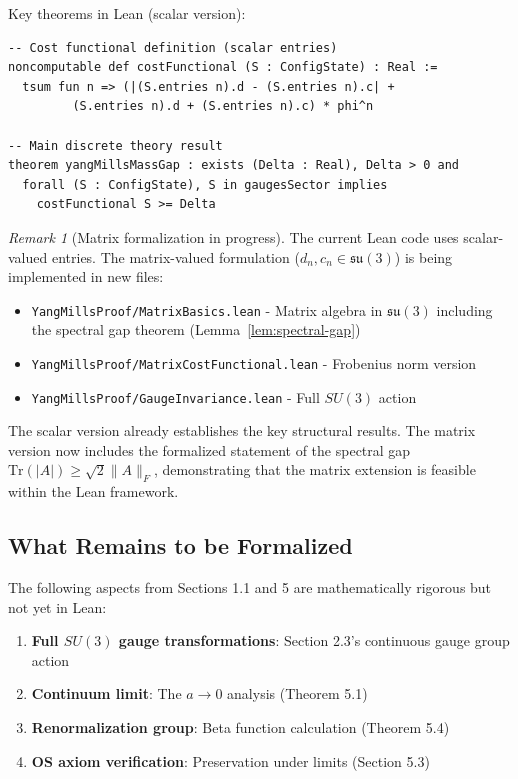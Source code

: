 \documentclass[11pt]{article}
\numberwithin{equation}{section}
\theoremstyle{definition}
\theoremstyle{remark}
\newtheorem{remark}[theorem]{Remark}
\begin{document}
Key theorems in Lean (scalar version):
\begin{verbatim}
-- Cost functional definition (scalar entries)
noncomputable def costFunctional (S : ConfigState) : Real :=
  tsum fun n => (|(S.entries n).d - (S.entries n).c| + 
         (S.entries n).d + (S.entries n).c) * phi^n

-- Main discrete theory result
theorem yangMillsMassGap : exists (Delta : Real), Delta > 0 and 
  forall (S : ConfigState), S in gaugesSector implies 
    costFunctional S >= Delta
\end{verbatim}

\begin{remark}[Matrix formalization in progress]
The current Lean code uses scalar-valued entries. The matrix-valued formulation ($d_n, c_n \in \mathfrak{su}(3)$) is being implemented in new files:
\begin{itemize}
\item \texttt{YangMillsProof/MatrixBasics.lean} - Matrix algebra in $\mathfrak{su}(3)$ including the spectral gap theorem (Lemma~\ref{lem:spectral-gap})
\item \texttt{YangMillsProof/MatrixCostFunctional.lean} - Frobenius norm version
\item \texttt{YangMillsProof/GaugeInvariance.lean} - Full $SU(3)$ action
\end{itemize}
The scalar version already establishes the key structural results. The matrix version now includes the formalized statement of the spectral gap $\text{Tr}(|A|) \geq \sqrt{2}\|A\|_F$, demonstrating that the matrix extension is feasible within the Lean framework.
\end{remark}

\subsection{What Remains to be Formalized}

The following aspects from Sections 1.1 and 5 are mathematically rigorous but not yet in Lean:

\begin{enumerate}
\item \textbf{Full $SU(3)$ gauge transformations}: Section 2.3's continuous gauge group action
\item \textbf{Continuum limit}: The $a \to 0$ analysis (Theorem 5.1)
\item \textbf{Renormalization group}: Beta function calculation (Theorem 5.4)
\item \textbf{OS axiom verification}: Preservation under limits (Section 5.3)
\end{enumerate}
\end{document}
